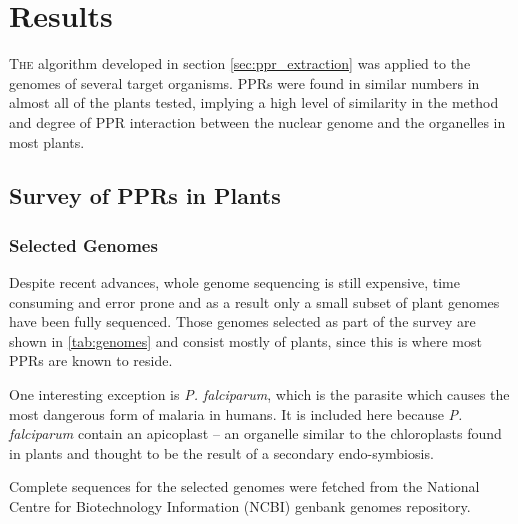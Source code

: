 
\chapter{Results} 
\label{chap:results}

\lettrine{T}{he} 
algorithm developed in section \ref{sec:ppr_extraction} was applied to the
genomes of several target organisms.
PPRs were found in similar numbers in almost all of the plants tested, implying
a high level of similarity in the method and degree of PPR interaction between
the nuclear genome and the organelles in most plants.

\section{Survey of PPRs in Plants}
\label{sec:ppr_survey}

\subsection{Selected Genomes}
\label{sec:survey_genomes}

Despite recent advances, whole genome sequencing is still expensive,
time consuming and error prone and as a result only a small subset of plant
genomes have been fully sequenced.
Those genomes selected as part of the survey are shown in \ref{tab:genomes} and
consist mostly of plants, since this is where most PPRs are known to reside.

One interesting exception is \emph{P. falciparum}, which is the parasite which
causes the most dangerous form of malaria in humans.
It is included here because \emph{P. falciparum} contain an apicoplast -- 
an organelle similar to the chloroplasts found in plants and thought to be the 
result of a secondary endo-symbiosis. 

Complete sequences for the selected genomes were fetched from the National
Centre for Biotechnology Information (NCBI) genbank genomes repository.


